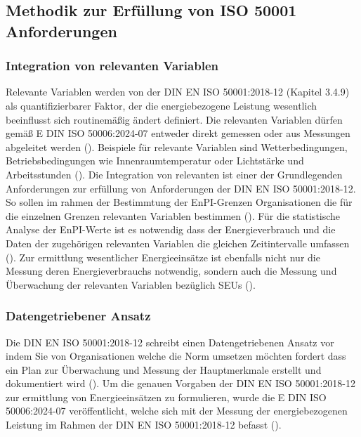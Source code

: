 \subsection{Methodik zur Erfüllung von ISO 50001 Anforderungen}

\subsubsection{Integration von relevanten Variablen}
Relevante Variablen werden von der DIN EN ISO 50001:2018-12 (Kapitel 3.4.9) als quantifizierbarer Faktor, der die energiebezogene Leistung wesentlich beeinflusst sich 
routinemäßig ändert definiert. 
Die relevanten Variablen dürfen gemäß E DIN ISO 50006:2024-07 entweder direkt gemessen oder aus Messungen abgeleitet werden (\cite[S. 18]{DIN50006.2024}).
Beispiele für relevante Variablen sind Wetterbedingungen, Betriebsbedingungen wie Innenraumtemperatur oder Lichtstärke und Arbeitsstunden (\cite[Kapitel 3.4.9]{DIN50001.2018}).
Die Integration von relevanten ist einer der Grundlegenden Anforderungen zur erfüllung von Anforderungen der DIN EN ISO 50001:2018-12.
So sollen im rahmen der Bestimmtung der EnPI-Grenzen Organisationen die für die einzelnen Grenzen relevanten Variablen bestimmen (\cite[S. 17]{DIN50006.2024}).
Für die statistische Analyse der EnPI-Werte ist es notwendig dass der Energieverbrauch und die Daten der zugehörigen relevanten Variablen 
die gleichen Zeitintervalle umfassen (\cite[S. 20]{DIN50006.2024}).
Zur ermittlung wesentlicher Energieeinsätze ist ebenfalls nicht nur die Messung deren Energieverbrauchs notwendig, sondern auch die Messung und Überwachung der 
relevanten Variablen bezüglich SEUs (\cite[S. 23]{DIN50001.2018}). 


\subsubsection{Datengetriebener Ansatz}

Die DIN EN ISO 50001:2018-12 schreibt einen Datengetriebenen Ansatz vor indem Sie von Organisationen welche die Norm umsetzen möchten fordert dass ein Plan zur 
Überwachung und Messung der Hauptmerkmale erstellt und dokumentiert wird (\cite[S. 30ff.]{DIN50001.2018}).
Um die genauen Vorgaben der DIN EN ISO 50001:2018-12 zur ermittlung von Energieeinsätzen zu formulieren, wurde die E DIN ISO 50006:2024-07 veröffentlicht,
welche sich mit der Messung der energiebezogenen Leistung im Rahmen der DIN EN ISO 50001:2018-12 befasst (\cite[S. 1]{DIN50006.2024}).

